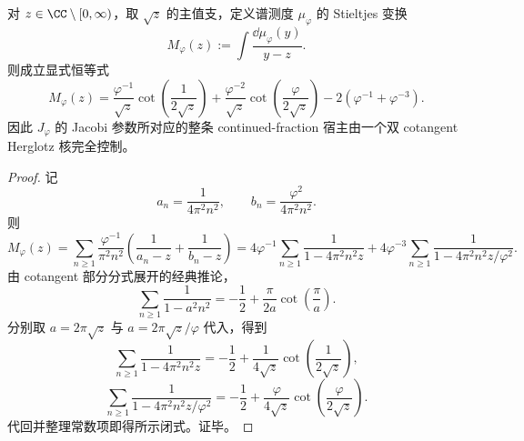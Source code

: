 \begin{theorem}\label{thm:xi-time-part9zbl-foldpi-weyl-stieltjes-closed-form}
对 \(z\in\CC\setminus[0,\infty)\)，取 \(\sqrt z\) 的主值支，定义谱测度 \(\mu_\varphi\) 的 Stieltjes 变换
\[
M_\varphi(z):=\int\frac{\dd\mu_\varphi(y)}{y-z}.
\]
则成立显式恒等式
\[
M_\varphi(z)
=
\frac{\varphi^{-1}}{\sqrt z}\cot\!\left(\frac{1}{2\sqrt z}\right)
+
\frac{\varphi^{-2}}{\sqrt z}\cot\!\left(\frac{\varphi}{2\sqrt z}\right)
-2(\varphi^{-1}+\varphi^{-3}).
\]
因此 \(J_\varphi\) 的 Jacobi 参数所对应的整条 continued-fraction 宿主由一个双 cotangent Herglotz 核完全控制。
\end{theorem}
\begin{proof}
记
\[
a_n=\frac{1}{4\pi^2n^2},
\qquad
b_n=\frac{\varphi^2}{4\pi^2n^2}.
\]
则
\[
M_\varphi(z)
=
\sum_{n\ge 1}\frac{\varphi^{-1}}{\pi^2n^2}
\left(\frac{1}{a_n-z}+\frac{1}{b_n-z}\right)
=
4\varphi^{-1}\sum_{n\ge 1}\frac{1}{1-4\pi^2n^2z}
+
4\varphi^{-3}\sum_{n\ge 1}\frac{1}{1-4\pi^2n^2z/\varphi^2}.
\]
由 cotangent 部分分式展开的经典推论，
\[
\sum_{n\ge 1}\frac{1}{1-a^2n^2}
=
-\frac{1}{2}+\frac{\pi}{2a}\cot\!\left(\frac{\pi}{a}\right).
\]
分别取 \(a=2\pi\sqrt z\) 与 \(a=2\pi\sqrt z/\varphi\) 代入，得到
\[
\sum_{n\ge 1}\frac{1}{1-4\pi^2n^2z}
=
-\frac{1}{2}+\frac{1}{4\sqrt z}\cot\!\left(\frac{1}{2\sqrt z}\right),
\]
\[
\sum_{n\ge 1}\frac{1}{1-4\pi^2n^2z/\varphi^2}
=
-\frac{1}{2}+\frac{\varphi}{4\sqrt z}\cot\!\left(\frac{\varphi}{2\sqrt z}\right).
\]
代回并整理常数项即得所示闭式。证毕。
\end{proof}

